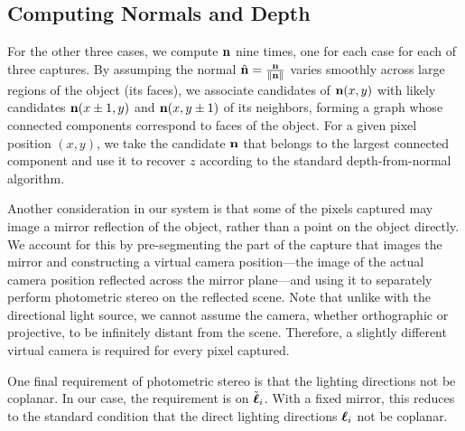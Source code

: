 \subsection{Computing Normals and Depth}
For the other three cases, we compute $\mathbf{n}$ nine times, one for each case
for each of three captures. By assumping the normal $\hat{\mathbf{n}} =
\frac{\mathbf{n}}{\|\mathbf{n}\|}$ varies smoothly across large regions of the object
(its faces), we associate candidates of $\mathbf{n}(x, y)$ with likely candidates
$\mathbf{n}(x \pm 1, y)$ and $\mathbf{n}(x, y \pm 1)$ of its neighbors, forming a graph
whose connected components correspond to faces of the object.  For a given
pixel position $(x, y)$, we take the candidate $\mathbf{n}$ that belongs to the
largest connected component and use it to recover $z$ according to the standard
depth-from-normal algorithm.

Another consideration in our system is that some of the pixels captured may
image a mirror reflection of the object, rather than a point on the object
directly. We account for this by pre-segmenting the part of the capture that
images the mirror and constructing a virtual camera position---the image of the
actual camera position reflected across the mirror plane---and using it to
separately perform photometric stereo on the reflected scene. Note that unlike
with the directional light source, we cannot assume the camera, whether
orthographic or projective, to be infinitely distant from the scene. Therefore,
a slightly different virtual camera is required for every pixel captured.

One final requirement of photometric stereo is that the lighting directions not
be coplanar. In our case, the requirement is on $\tilde{\boldsymbol{\ell}}_i$. With a
fixed mirror, this reduces to the standard condition that the direct lighting
directions $\boldsymbol{\ell}_i$ not be coplanar.
